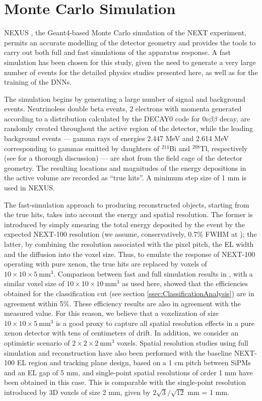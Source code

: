 \documentclass[a4paper,11pt]{article}
\begin{document}
\section{Monte Carlo Simulation}\label{sec.MC}
NEXUS \cite{MartinAlbo_thesis}, the  Geant4-based \cite{GEANT4} Monte Carlo simulation of the NEXT experiment, permits an accurate modelling of the detector geometry and provides the tools to carry out both full and fast simulations of the apparatus response. A fast simulation has been chosen for this study, given the need to generate a very large number of events for the detailed physics studies presented here, as well as for the training of the DNNs.

The simulation begins by generating a large number of signal and background events. Neutrinoless double beta events, 2 electrons with momenta generated according to a distribution calculated by the DECAY0 code \cite{Ponkratenko_2000} for $0\nu\beta\beta$ decay, are randomly created throughout the active region of the detector, while the leading background events --- gamma rays of energies 2.447 MeV and 2.614 MeV corresponding to gammas emitted by daughters of $^{214}$Bi and $^{208}$Tl, respectively (see \cite{NEXT_sensitivity} for a thorough discussion) --- are shot from the field cage of the detector geometry.  The resulting locations and magnitudes of the energy depositions in the active volume are recorded as ``true hits''.  A minimum step size of 1 mm is used in NEXUS.

The fast-simulation approach to producing reconstructed objects, starting from the true hits, takes into account the energy and spatial resolution. The former is introduced by simply smearing the total energy deposited by the event by the expected NEXT-100 resolution (we assume, conservatively, 0.7\% FWHM at \Qbb); the latter, by combining the resolution associated with the pixel pitch, the EL width and the diffusion into the voxel size. Thus, to emulate the response of NEXT-100 operating with pure xenon, the true hits are replaced by voxels of $10 \times 10 \times 5 \mathrm{~mm^3}$. Comparison between fast and full simulation results in \cite{NEXT_topology}, with a similar voxel size of $10 \times 10 \times 10 \mathrm{~mm^3}$ as used here, showed that the efficiencies obtained for the classification cut (see section \ref{ssec:ClassificationAnalysis}) are in agreement within 5\%. These efficiency results are also in agreement with the measured value. For this reason, we believe that a voxelization of size $10 \times 10 \times 5 \mathrm{~mm^3}$ is a good proxy to capture all spatial resolution effects in a pure xenon detector with tens of centimeters of drift. In addition, we consider an optimistic scenario of $2 \times 2 \times 2 \mathrm{~mm^3}$ voxels. Spatial resolution studies using full simulation and reconstruction have also been performed with the baseline NEXT-100 EL region and tracking plane design, based on a 1 cm pitch between SiPMs and an EL gap of 5 mm, and single-point spatial resolutions of order 1 mm have been obtained in this case. This is comparable with the single-point resolution introduced by 3D voxels of size 2 mm, given by $2\sqrt{3} / \sqrt{12}$ mm = 1 mm.
\end{document}
